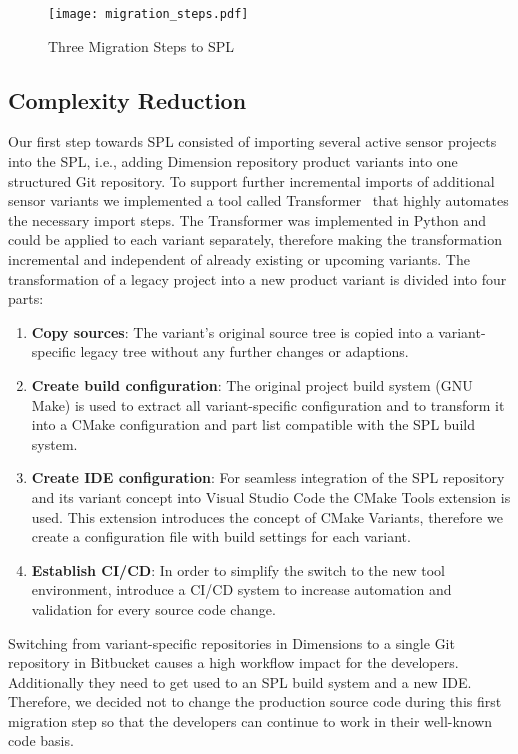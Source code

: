 \begin{figure*}[ht]
  \centering
  \texttt{[image: migration\_steps.pdf]}
  \caption{Three Migration Steps to SPL}
  \label{fig:threeMigrationSteps}
\end{figure*}

\subsection{Complexity Reduction}\label{complexity}

Our first step towards SPL consisted of importing several active sensor projects into
the SPL, i.e., adding Dimension repository product variants into one structured Git
repository. To support further incremental imports of additional sensor variants
we implemented a tool called Transformer~\cite{GithubTransformer} that highly
automates the necessary import steps. The Transformer was implemented in Python
and could be applied to each variant separately, therefore making the transformation
incremental and independent of already existing or upcoming variants. The transformation
of a legacy project into a new product variant is divided into four parts:

\begin{enumerate}
  \item \textbf{Copy sources}: The variant's original source tree is copied
        into a variant-specific legacy tree without any further changes or
        adaptions.
  \item \textbf{Create build configuration}: The original project build
        system (GNU Make) is used to extract all variant-specific configuration and
        to transform it into a CMake configuration and part list compatible with
        the SPL build system.
  \item \textbf{Create IDE configuration}: For seamless integration of the SPL
        repository and its variant concept into Visual Studio Code the
        CMake Tools extension is used. This extension introduces the concept of CMake
        Variants, therefore we create a configuration file with build settings
        for each variant.
  \item \textbf{Establish CI/CD}: In order to simplify the switch to the new
        tool environment, introduce a CI/CD system to increase automation and
        validation for every source code change.
\end{enumerate}

Switching from variant-specific repositories in Dimensions to a single Git
repository in Bitbucket causes a high workflow impact for the developers.
Additionally they need to get used to an SPL build system and a new IDE.
Therefore, we decided not to change the production source code during this first
migration step so that the developers can continue to work in their well-known
code basis.

